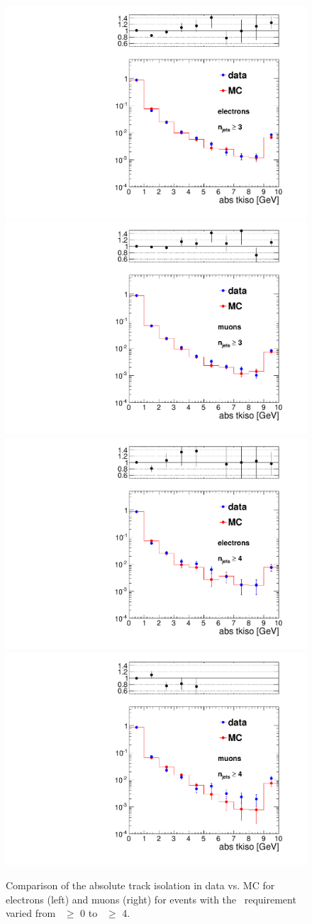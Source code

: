 \begin{figure}[hbt]
\begin{center}
	\includegraphics[width=0.3\linewidth]{plots/el_tkiso_3j.pdf}%
	\includegraphics[width=0.3\linewidth]{plots/mu_tkiso_3j.pdf}
	\includegraphics[width=0.3\linewidth]{plots/el_tkiso_4j.pdf}%
	\includegraphics[width=0.3\linewidth]{plots/mu_tkiso_4j.pdf}
	\caption{
	  \label{fig:tnp} Comparison of the absolute track isolation in data vs. MC for electrons (left) and muons (right)
for events with the \njets\ requirement varied from \njets\ $\geq$ 0 to \njets\ $\geq$ 4. 
}  
      \end{center}
\end{figure}

\clearpage

